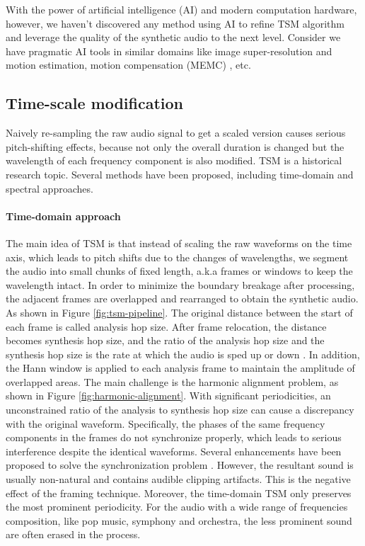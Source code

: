 \documentclass[12pt]{article}
\begin{document}
With the power of artificial intelligence (AI) and modern computation hardware, however, we haven't discovered any method using AI to refine TSM algorithm and leverage the quality of the synthetic audio to the next level. Consider we have pragmatic AI tools in similar domains like image super-resolution \cite{led17} and motion estimation, motion compensation (MEMC) \cite{bao21}, etc.

\subsection{Time-scale modification}
Naively re-sampling the raw audio signal to get a scaled version causes serious pitch-shifting effects, because not only the overall duration is changed but the wavelength of each frequency component is also modified. TSM is a historical research topic. Several methods have been proposed, including time-domain and spectral approaches.

\paragraph{Time-domain approach}
The main idea of TSM is that instead of scaling the raw waveforms on the time axis, which leads to pitch shifts due to the changes of wavelengths, we segment the audio into small chunks of fixed length, a.k.a frames or windows to keep the wavelength intact. In order to minimize the boundary breakage after processing, the adjacent frames are overlapped and rearranged to obtain the synthetic audio. As shown in Figure \ref{fig:tsm-pipeline}. The original distance between the start of each frame is called analysis hop size. After frame relocation, the distance becomes synthesis hop size, and the ratio of the analysis hop size and the synthesis hop size is the rate at which the audio is sped up or down \cite{dri16}. In addition, the Hann window \cite{ess86} is applied to each analysis frame to maintain the amplitude of overlapped areas. The main challenge is the harmonic alignment problem, as shown in Figure \ref{fig:harmonic-alignment}. With significant periodicities, an unconstrained ratio of the analysis to synthesis hop size can cause a discrepancy with the original waveform. Specifically, the phases of the same frequency components in the frames do not synchronize properly, which leads to serious interference despite the identical waveforms. Several enhancements have been proposed to solve the synchronization problem \cite{hej91}\cite{eri90}\cite{ver93}. However, the resultant sound is usually non-natural and contains audible clipping artifacts. This is the negative effect of the framing technique. Moreover, the time-domain TSM only preserves the most prominent periodicity. For the audio with a wide range of frequencies composition, like pop music, symphony and orchestra, the less prominent sound are often erased in the process.
\end{document}
